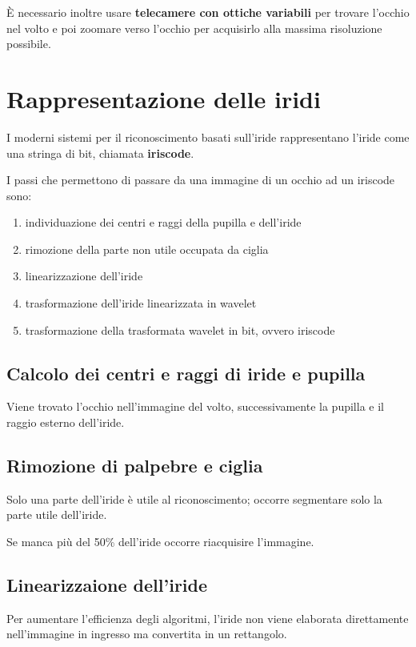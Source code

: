 \noindent È necessario inoltre usare \textbf{telecamere con ottiche variabili} per trovare
l'occhio nel volto e poi zoomare verso l'occhio per acquisirlo alla massima
risoluzione possibile.

\section{Rappresentazione delle iridi}
I moderni sistemi per il riconoscimento basati sull'iride rappresentano l'iride come 
una stringa di bit, chiamata \textbf{iriscode}.

\noindent I passi che permettono di passare da una immagine di un occhio ad un iriscode sono:
\begin{enumerate}
    \item individuazione dei centri e raggi della pupilla e dell'iride 
    \item rimozione della parte non utile occupata da ciglia 
    \item linearizzazione dell'iride
    \item trasformazione dell'iride linearizzata in wavelet
    \item trasformazione della trasformata wavelet in bit, ovvero iriscode
\end{enumerate}

\subsection{Calcolo dei centri e raggi di iride e pupilla}
Viene trovato l'occhio nell'immagine del volto, successivamente la pupilla 
e il raggio esterno dell'iride.

\subsection{Rimozione di palpebre e ciglia}
Solo una parte dell'iride è utile al riconoscimento; occorre segmentare 
solo la parte utile dell'iride.

\noindent Se manca più del 50\% dell'iride occorre riacquisire l'immagine.

\subsection{Linearizzaione dell'iride}
Per aumentare l'efficienza degli algoritmi, l'iride non viene elaborata
direttamente nell'immagine in ingresso ma convertita in un rettangolo.

